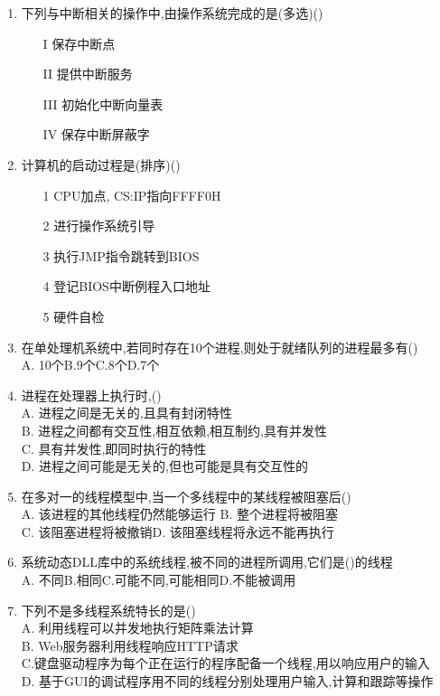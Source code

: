 \documentclass[12pt, a4paper, oneside, UTF8]{ctexbook}
\begin{document}
\begin{enumerate}
    \item 下列与中断相关的操作中,由操作系统完成的是(多选)()  
    \begin{enumerate}
        \item [I] 保存中断点
        \item [II] 提供中断服务
        \item [III] 初始化中断向量表
        \item [IV] 保存中断屏蔽字
    \end{enumerate}

    \item 计算机的启动过程是(排序)() 
    \begin{enumerate}
        \item [1] CPU加点, CS:IP指向FFFF0H
        \item [2] 进行操作系统引导
        \item [3] 执行JMP指令跳转到BIOS
        \item [4] 登记BIOS中断例程入口地址
        \item [5] 硬件自检
    \end{enumerate}

    \item 在单处理机系统中,若同时存在10个进程,则处于就绪队列的进程最多有() \\
    A. 10个\qquad B.9个\qquad C.8个\qquad D.7个 

    \item 进程在处理器上执行时,() \\
    A. 进程之间是无关的,且具有封闭特性 \\
    B. 进程之间都有交互性,相互依赖,相互制约,具有并发性 \\
    C. 具有并发性,即同时执行的特性 \\
    D. 进程之间可能是无关的,但也可能是具有交互性的

    \item 在多对一的线程模型中,当一个多线程中的某线程被阻塞后() \\
    A. 该进程的其他线程仍然能够运行 \qquad B. 整个进程将被阻塞 \\
    C. 该阻塞进程将被撤销\qquad D. 该阻塞线程将永远不能再执行 

    \item 系统动态DLL库中的系统线程,被不同的进程所调用,它们是()的线程 \\
    A. 不同\qquad B.相同\qquad C.可能不同,可能相同\qquad D.不能被调用

    \item 下列不是多线程系统特长的是() \\
    A. 利用线程可以并发地执行矩阵乘法计算 \\
    B. Web服务器利用线程响应HTTP请求 \\
    C.键盘驱动程序为每个正在运行的程序配备一个线程,用以响应用户的输入 \\
    D. 基于GUI的调试程序用不同的线程分别处理用户输入,计算和跟踪等操作


\end{enumerate}
\end{document}
